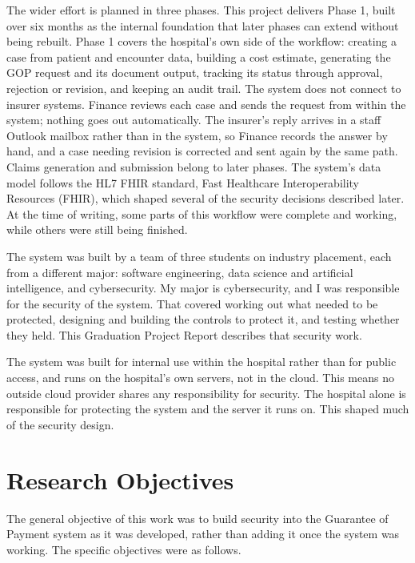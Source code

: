 The wider effort is planned in three phases. This project delivers Phase 1, built over six months as the internal foundation that later phases can extend without being rebuilt. Phase 1 covers the hospital's own side of the workflow: creating a case from patient and encounter data, building a cost estimate, generating the GOP request and its document output, tracking its status through approval, rejection or revision, and keeping an audit trail. The system does not connect to insurer systems. Finance reviews each case and sends the request from within the system; nothing goes out automatically. The insurer's reply arrives in a staff Outlook mailbox rather than in the system, so Finance records the answer by hand, and a case needing revision is corrected and sent again by the same path. Claims generation and submission belong to later phases. The system's data model follows the HL7 FHIR standard, Fast Healthcare Interoperability Resources (FHIR), which shaped several of the security decisions described later. At the time of writing, some parts of this workflow were complete and working, while others were still being finished.

The system was built by a team of three students on industry placement, each from a different major: software engineering, data science and artificial intelligence, and cybersecurity. My major is cybersecurity, and I was responsible for the security of the system. That covered working out what needed to be protected, designing and building the controls to protect it, and testing whether they held. This Graduation Project Report describes that security work.

The system was built for internal use within the hospital rather than for public access, and runs on the hospital's own servers, not in the cloud. This means no outside cloud provider shares any responsibility for security. The hospital alone is responsible for protecting the system and the server it runs on. This shaped much of the security design.

\section{Research Objectives}
\label{sec:intro-objectives}

The general objective of this work was to build security into the Guarantee of Payment system as it was developed, rather than adding it once the system was working. The specific objectives were as follows.

